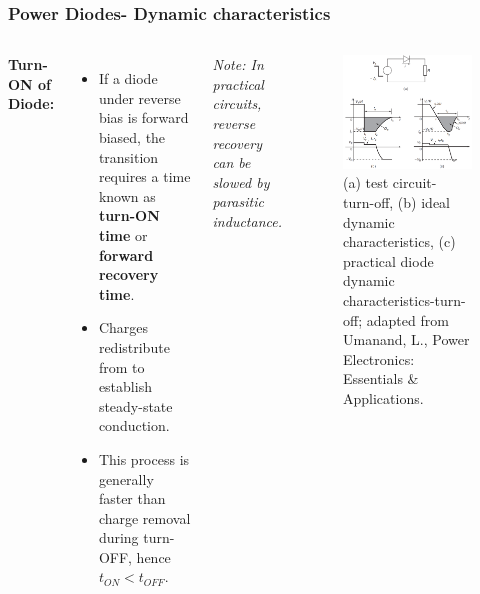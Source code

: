 \begin{frame}
    \frametitle{Power Diodes- Dynamic characteristics}
    \begin{columns}
        \textbf{Turn-ON of Diode:}
        \begin{itemize}
            \item If a diode under reverse bias is forward biased, the transition requires a time known as \textbf{turn-ON time} or \textbf{forward recovery time}.
            \item Charges redistribute from to establish steady-state conduction.
            \item This process is generally faster than charge removal during turn-OFF, hence $t_{ON} < t_{OFF}$.
        \end{itemize}
        \vspace{0.2cm}
        \textit{Note: In practical circuits, reverse recovery can be slowed by parasitic inductance.}

        \begin{figure}
            \centering
            \includegraphics[scale=0.25]{fig/lec04/dynamic_characteristics_diode.png}
            \caption{(a) test circuit- turn-off, (b) ideal dynamic characteristics, (c) practical diode dynamic characteristics-turn-off; adapted from Umanand, L., Power Electronics: Essentials \& Applications.}
            \label{fig:dynamic_diode_characteristics}
        \end{figure}
    \end{columns}
\end{frame}

